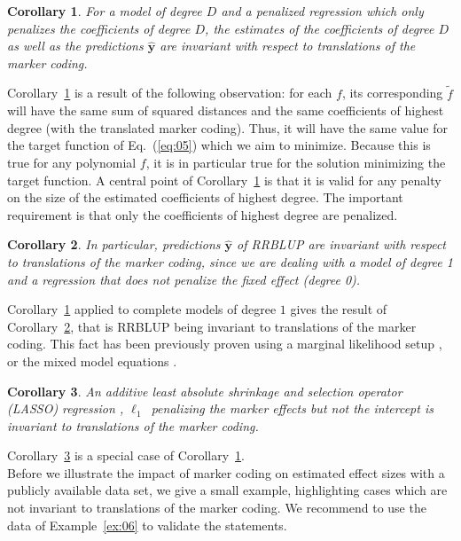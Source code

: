 \documentclass{bmcart}
\newtheorem{corollary}{Corollary}
\newcommand{\0}{\mathbf{0}}
\newcommand{\y}{\mathbf{y}}
\begin{document}
	\begin{corollary}\label{cor:02} For a model of degree $D$ and a penalized regression which only penalizes the coefficients of degree $D$, the estimates of the coefficients of degree $D$ as well as the predictions $\hat{\y}$ are invariant with respect to translations of the marker coding. 
	\end{corollary}

Corollary~\ref{cor:02} is a result of the following observation: for each $f$, its corresponding $\tilde{f}$ will have the same sum of squared distances and the same coefficients of highest degree (with the translated marker coding). Thus, it will have the same value for the target function of Eq.~(\ref{eq:05}) which we aim to minimize.
Because this is true for any polynomial $f$, it is in particular true for the solution minimizing the target function. 
A central point of Corollary~\ref{cor:02} is that it is valid for any penalty on the size of the estimated coefficients of highest degree. The important requirement is that only the coefficients of highest degree are penalized.


	\begin{corollary}\label{cor:03}	In particular, predictions $\hat{\y}$ of RRBLUP are invariant with respect to translations of the marker coding, since we are dealing with a model of degree 1 and a regression that does not penalize the fixed effect (degree 0). 
	\end{corollary}
Corollary~\ref{cor:02} applied to complete models of degree $1$ gives the result of Corollary~\ref{cor:03}, that is RRBLUP being invariant to translations of the marker coding.
This fact has  been previously proven using a marginal likelihood setup \cite{stranden11}, or the mixed model equations \cite{Martini17}. 


		\begin{corollary}\label{cor:04} An additive least absolute shrinkage and selection operator (LASSO) regression \cite{tibshirani96}, $\ell_1$~penalizing the marker effects but not the intercept is invariant to translations of the marker coding. 
\end{corollary}
Corollary~\ref{cor:04} is a special case of Corollary~\ref{cor:02}. \\

Before we illustrate the impact of marker coding on estimated effect sizes with a publicly available data set, we give a small example, highlighting cases which are not invariant to translations of the marker coding.
We recommend to use the data of Example~\ref{ex:06} to validate the statements.\\
\end{document}
